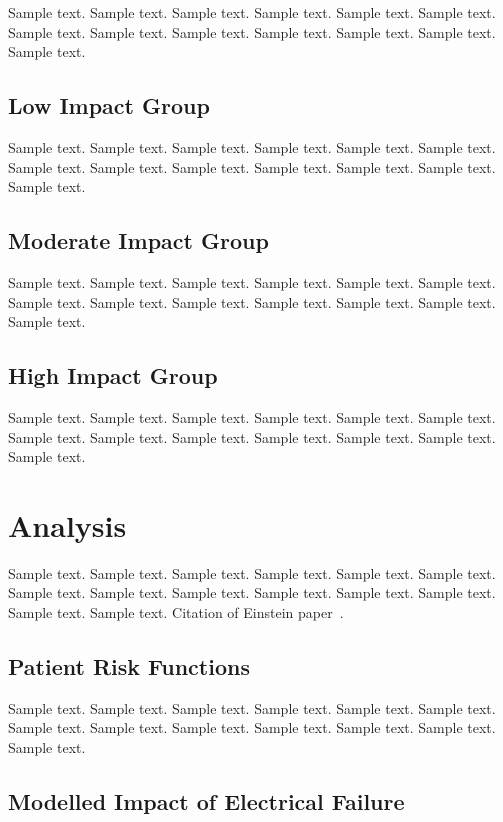 \documentclass[preprint,12pt,3p]{elsarticle}
\begin{document}
Sample text. Sample text. Sample text. Sample text. Sample text. Sample text. 
Sample text. Sample text. Sample text. Sample text. Sample text. Sample text. 
Sample text.

\subsection{Low Impact Group}
\label{subsec2}

Sample text. Sample text. Sample text. Sample text. Sample text. Sample text. 
Sample text. Sample text. Sample text. Sample text. Sample text. Sample text. 
Sample text.

\subsection{Moderate Impact Group}
\label{subsec2}

Sample text. Sample text. Sample text. Sample text. Sample text. Sample text. 
Sample text. Sample text. Sample text. Sample text. Sample text. Sample text. 
Sample text.

\subsection{High Impact Group}
\label{subsec2}

Sample text. Sample text. Sample text. Sample text. Sample text. Sample text. 
Sample text. Sample text. Sample text. Sample text. Sample text. Sample text. 
Sample text.

\section{Analysis}
\label{sec1}

Sample text. Sample text. Sample text. Sample text. Sample text. Sample text. 
Sample text. Sample text. Sample text. Sample text. Sample text. Sample text. 
Sample text. Sample text. Citation of Einstein paper~\cite{Einstein}.

\subsection{Patient Risk Functions}
\label{subsec2}

Sample text. Sample text. Sample text. Sample text. Sample text. Sample text. 
Sample text. Sample text. Sample text. Sample text. Sample text. Sample text. 
Sample text.

\subsection{Modelled Impact of Electrical Failure}
\label{subsec2}
\end{document}
